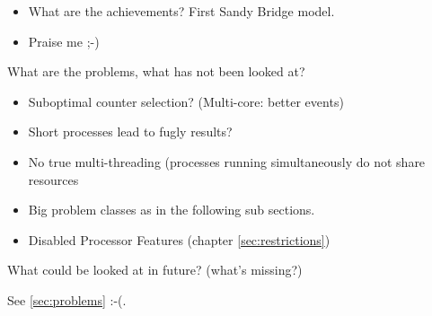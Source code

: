 
\begin{itemize}

\item What are the achievements? First Sandy Bridge model.

\item Praise me ;-)

\end{itemize}


\label{sec:problems}

What are the problems, what has not been looked at?

\begin{itemize}

\item Suboptimal counter selection? (Multi-core: better events)

\item Short processes lead to fugly results?

\item No true multi-threading (processes running simultaneously do not share
resources

\item Big problem classes as in the following sub sections.

\item Disabled Processor Features (chapter \ref{sec:restrictions})

\end{itemize}


\label{sec:outlook}

What could be looked at in future? (what's missing?)

See \ref{sec:problems} :-(.
